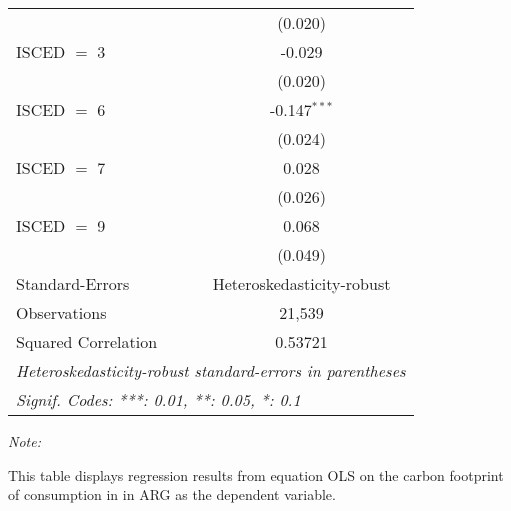 \begin{table}[htbp!]
\begin{adjustbox}{width = 1\textwidth, max height = 0.95\textheight, center}
\begin{threeparttable}[b]
\begin{tabular}{lc}
                                & (0.020)\\   
            ISCED $=$ 3         & -0.029\\   
                                & (0.020)\\   
            ISCED $=$ 6         & -0.147$^{***}$\\   
                                & (0.024)\\   
            ISCED $=$ 7         & 0.028\\   
                                & (0.026)\\   
            ISCED $=$ 9         & 0.068\\   
                                & (0.049)\\   
            \midrule 
            Standard-Errors     & Heteroskedasticity-robust \\   
            Observations        & 21,539\\  
            Squared Correlation & 0.53721\\  
            \midrule \midrule
            \multicolumn{2}{l}{\emph{Heteroskedasticity-robust standard-errors in parentheses}}\\
            \multicolumn{2}{l}{\emph{Signif. Codes: ***: 0.01, **: 0.05, *: 0.1}}\\
         \end{tabular}
         
         \begin{tablenotes}\item \medskip \textit{Note:}
            \item This table displays regression results from equation OLS on the carbon footprint of consumption in  in ARG as the dependent variable.  
         \end{tablenotes}
      \end{threeparttable}
   \end{adjustbox}
\end{table}


